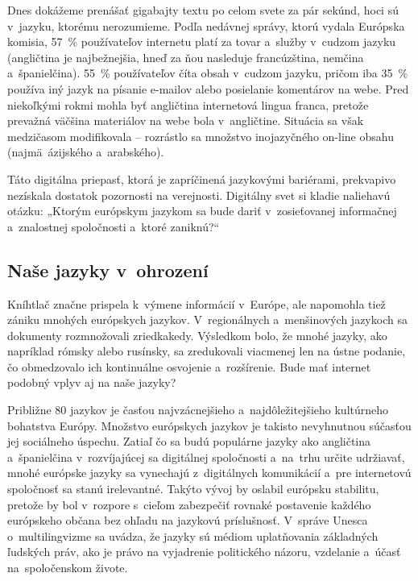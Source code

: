 \begin{multicols}{2}
Dnes dokážeme prenášať gigabajty textu po celom svete za pár
sekúnd, hoci sú v~jazyku, ktorému nerozumieme. Podľa nedávnej
správy, ktorú vydala Európska komisia, 57~\% používateľov
internetu platí za tovar a~služby v~cudzom jazyku (angličtina je
najbežnejšia, hneď za ňou nasleduje francúzština, nemčina
a~španielčina). 55~\% používateľov číta obsah v~cudzom jazyku,
pričom iba 35~\% používa iný jazyk na písanie e-mailov alebo
posielanie komentárov na webe\cite{EC1}. Pred
niekoľkými rokmi mohla byť angličtina internetová lingua franca,
pretože prevažná väčšina materiálov na webe bola v~angličtine.
Situácia sa však medzičasom modifikovala – rozrástlo sa množstvo
inojazyčného on-line obsahu (najmä~ázijského a~arabského).

Táto digitálna priepasť, ktorá je zapríčinená jazykovými
bariérami, prekvapivo nezískala dostatok pozornosti na verejnosti.
Digitálny svet si kladie naliehavú otázku: „Ktorým európskym
jazykom sa bude dariť v~zosieťovanej informačnej a~znalostnej
spoločnosti a~ktoré zaniknú?“

\subsection{Naše jazyky v~ohrození}
Kníhtlač značne prispela k~výmene informácií v~Európe, ale napomohla tiež zániku mnohých európskych jazykov. V~regionálnych a~menšinových jazykoch sa dokumenty rozmnožovali zriedkakedy. Výsledkom bolo, že mnohé jazyky, ako napríklad rómsky alebo rusínsky, sa zredukovali viacmenej len na ústne podanie, čo obmedzovalo ich kontinuálne osvojenie a~rozšírenie. Bude mať internet podobný vplyv aj na naše jazyky?


Približne 80 jazykov je časťou najvzácnejšieho a~najdôležitejšieho kultúrneho bohatstva Európy. Množstvo európskych jazykov je takisto nevyhnutnou súčasťou jej sociálneho úspechu\cite{EC2}. Zatiaľ čo sa budú populárne jazyky ako angličtina a~španielčina v~rozvíjajúcej sa digitálnej spoločnosti a~na~trhu určite udržiavať, mnohé európske jazyky sa vynechajú z~digitálnych komunikácií a~pre internetovú spoločnosť sa stanú irelevantné. Takýto vývoj by oslabil európsku stabilitu, pretože by bol v~rozpore  s~cieľom zabezpečiť rovnaké postavenie každého európskeho občana bez ohľadu na jazykovú príslušnosť. V~správe Unesca o~multilingvizme sa uvádza, že jazyky sú médiom uplatňovania základných ľudských práv, ako je právo na vyjadrenie politického názoru, vzdelanie a~účasť na~spoločenskom živote\cite{Unesco1}.


\end{multicols}

